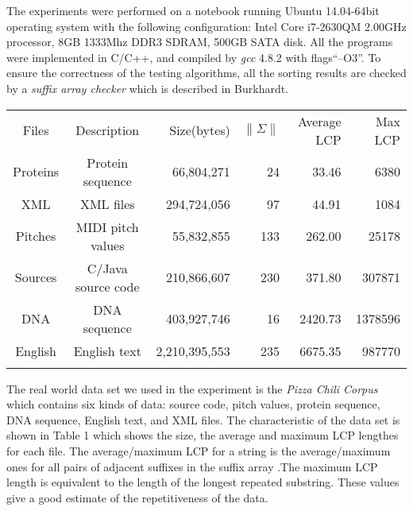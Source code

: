 \documentclass{ws-ijprai}
\begin{document}
The experiments were performed on a notebook running Ubuntu
14.04-64bit operating system with the following configuration: Intel
Core i7-2630QM 2.00GHz processor, 8GB 1333Mhz DDR3 SDRAM, 500GB SATA
disk. All the programs were implemented in C/C++, and compiled by
\emph{gcc} 4.8.2 with flags``--O3''. To ensure the correctness of the
testing algorithms, all the sorting results are checked by a
\emph{suffix array checker} which is described in
Burkhardt\cite{DC32}.

\begin{table}[th]
{ \begin{tabular}{@{}ccrrrr@{}} \toprule
  Files & Description & Size(bytes) & $\|\Sigma\|$ & Average LCP & Max LCP \\ \colrule
 Proteins & Protein sequence & 66,804,271 & 24 & 33.46 & 6380\\
 XML & XML files & 294,724,056 & 97 & 44.91 & 1084 \\
 Pitches & MIDI pitch values & 55,832,855 & 133 & 262.00 & 25178\\
 Sources & C/Java source code & 210,866,607 & 230 & 371.80 & 307871\\
 DNA & DNA sequence & 403,927,746 & 16 & 2420.73 & 1378596\\
 English & English text & 2,210,395,553 & 235  &6675.35 & 987770\\ \botrule
  \end{tabular}}
  \label{tab:data}
\end{table}

The real world data set we used in the experiment is the \emph{Pizza
 Chili Corpus}\cite{dataset} which contains six kinds of data:
source code, pitch values, protein sequence, DNA sequence, English
text, and XML files. The characteristic of the data set is shown in
Table 1 which shows the size, the average and maximum LCP
lengthes for each file. The average/maximum LCP for a string is the
average/maximum ones for all pairs of adjacent suffixes in the suffix
array .The maximum LCP length is equivalent to the length of the
longest repeated substring. These values give a good estimate of the
repetitiveness of the data.
\end{document}
